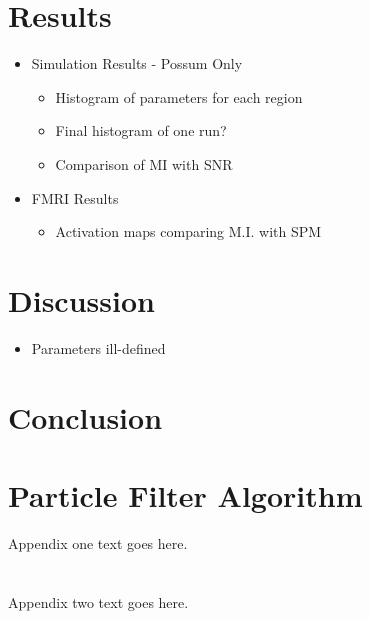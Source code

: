 \documentclass[journal]{./IEEEtran}
\begin{document}
\section{Results}
\label{sec:Results}
\begin{itemize}
\item Simulation Results - Possum Only
\begin{itemize}
    \item Histogram of parameters for each region
    \item Final histogram of one run?
    \item Comparison of MI with SNR
\end{itemize}
\item FMRI Results 
\begin{itemize}
    \item Activation maps comparing M.I. with SPM
\end{itemize}
\end{itemize}

\section{Discussion}
\label{sec:Discussion}

\begin{itemize}
\item Parameters ill-defined
\end{itemize}

\section{Conclusion}
\label{sec:Conclusion}


\appendices
\section{Particle Filter Algorithm}
Appendix one text goes here.

\section{}
Appendix two text goes here.





\end{document}
